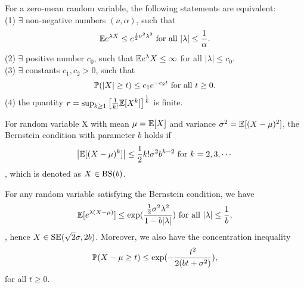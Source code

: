 \begin{theorem} For a zero-mean random variable, the following statements are equivalent: \\
(1) $\exists$ non-negative numbers $(\nu,\alpha)$, such that 
\begin{equation*}
    {\mathbb{E}} e^{\lambda X} \le e^{\frac{1}{2}\nu^2\lambda^2}\text{ for all } |\lambda|\le \frac{1}{\alpha}.
\end{equation*}
(2) $\exists$ positive number $c_0$, such that ${\mathbb{E}} e^\lambda X\le \infty$ for all $|\lambda|\le c_0$. \\
(3) $\exists$ constants $c_1, c_2 > 0$, such that $${\mathbb{P}}(|X|\ge t)\le c_1 e^{-c_2 t}\text{ for all }t\ge 0.$$
(4) the quantity $r=\sup_{k\ge 1}\big[ \frac{1}{k!} {\mathbb{E}} [X^k]\big]^{\frac{1}{k}}$ is finite.
\end{theorem}

\begin{definition}
For random variable X with mean $\mu={\mathbb{E}}[X]$ and variance $\sigma^2={\mathbb{E}}[(X-\mu)^2]$, the Bernstein condition with parameter $b$ holds if
\begin{equation}
    \big|{\mathbb{E}}[(X-\mu)^k]\big|\le \frac{1}{2}k!\sigma^2b^{k-2}\text{ for } k=2, 3,\cdots
\end{equation}, which is denoted as $X\in{\mathrm{BS}}{(b)}$.
\end{definition}

\begin{proposition} For any random variable satisfying the Bernstein condition, we have
\begin{equation}
    {\mathbb{E}}[e^{\lambda(X-\mu)}]\le \exp(\frac{\frac{1}{2}\sigma^2\lambda^2}{1-b|\lambda|})\text{ for all } |\lambda|\le \frac{1}{b},
\end{equation}, hence $X\in {\mathrm{SE}}{(\sqrt{2}\sigma, 2b)}$. Moreover, we also have the concentration inequality 
\begin{equation}
    {\mathbb{P}}(X-\mu\ge t) \le \exp(-\frac{t^2}{2(bt+\sigma^2)}),
\end{equation} for all $t\ge 0$.
\end{proposition}

